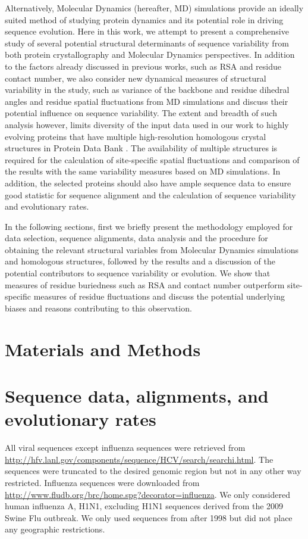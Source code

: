 \documentclass[12pt]{article}
\begin{document}
Alternatively, Molecular Dynamics (hereafter, MD) simulations provide an ideally suited method of studying protein dynamics and its potential role in driving sequence evolution.  Here in this work, we attempt to present a comprehensive study of several potential structural determinants of sequence variability from both protein crystallography and Molecular Dynamics perspectives. In addition to the factors already discussed in previous works, such as RSA and residue contact number, we also consider new dynamical measures of structural variability in the study, such as variance of the backbone and residue dihedral angles and residue spatial fluctuations from MD simulations and discuss their potential influence on sequence variability. The extent and breadth of such analysis however, limits diversity of the input data used in our work to highly evolving proteins that have multiple high-resolution homologous crystal structures in Protein Data Bank \citep{Berman2008}. The availability of multiple structures is required for the calculation of site-specific spatial fluctuations and comparison of the results with the same variability measures based on MD simulations. In addition, the selected proteins should also have ample sequence data to ensure good statistic for sequence alignment and the calculation of sequence variability and evolutionary rates.
	
In the following sections, first we briefly present the methodology employed for data selection, sequence alignments, data analysis and the procedure for obtaining the relevant structural variables from Molecular Dynamics simulations and homologous structures, followed by the results and a discussion of the potential contributors to sequence variability or evolution. We show that measures of residue buriedness such as RSA and contact number outperform site-specific measures of residue fluctuations and discuss the potential underlying biases and reasons contributing to this observation.

\section*{Materials and Methods}

\section*{Sequence data, alignments, and evolutionary rates}

All viral sequences except influenza sequences were retrieved from \url{http://hfv.lanl.gov/components/sequence/HCV/search/searchi.html}.
The sequences were truncated to the desired genomic region but not in any other way restricted. Influenza sequences were downloaded from \url{http://www.fludb.org/brc/home.spg?decorator=influenza}. We only considered human influenza A, H1N1, excluding H1N1 sequences derived from the 2009 Swine Flu outbreak. We only used sequences from after 1998 but did not place any geographic restrictions.
\end{document}
